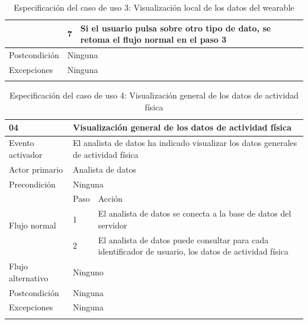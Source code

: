 \begin{table}[h]
\begin{tabularx}{\textwidth}{|l|l|X|}
            \cline{2-3} & 7 & Si el usuario pulsa sobre otro tipo de dato, se retoma el flujo normal en el paso 3 \\
            \hline
            Postcondición & \multicolumn{2}{|X|}{Ninguna} \\
            \hline
            Excepciones & \multicolumn{2}{|X|}{Ninguna} \\
            \hline
            \caption{Especificación del caso de uso 3: Visualización local de los datos del \gls{wearable}}
            \label{tabla:casos_uso:visualizacion_local_wearable}
        \end{tabularx}
    \end{table}

    \begin{table}[h]
        \centering
        \begin{tabularx}{\textwidth}{|l|l|X|}
            \hline
            04 & \multicolumn{2}{|X|}{Visualización general de los datos de actividad física} \\
            \hline
            Evento activador & \multicolumn{2}{|X|}{El analista de datos ha indicado visualizar los datos generales de actividad física} \\
            \hline
            Actor primario & \multicolumn{2}{|X|}{Analista de datos} \\
            \hline
            Precondición & \multicolumn{2}{|X|}{Ninguna} \\
            \hline
            \multirow{3}{*}{Flujo normal} & Paso & Acción \\
            \cline{2-3} & 1 & El analista de datos se conecta a la base de datos del servidor \\
            \cline{2-3} & 2 & El analista de datos puede consultar para cada identificador de usuario, los datos de actividad física \\
            \hline
            Flujo alternativo & \multicolumn{2}{|X|}{Ninguno} \\
            \hline
            Postcondición & \multicolumn{2}{|X|}{Ninguna} \\
            \hline
            Excepciones & \multicolumn{2}{|X|}{Ninguna} \\
            \hline
            \caption{Especificación del caso de uso 4: Visualización general de los datos de actividad física}
            \label{tabla:casos_uso:visualizacion_general_actividad}
        \end{tabularx}
    \end{table}
    
